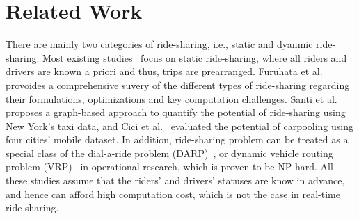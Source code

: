 \section{Related Work}
\label{sec:related}

There are mainly two categories of ride-sharing, i.e., static and dyanmic ride-sharing. Most existing studies~\cite{FuruhataTRB13, Santi14, CiciUbicom14} focus on static ride-sharing, where all riders and drivers are known a priori and thus, trips are prearranged. Furuhata et al.~\cite{FuruhataTRB13} provoides a comprehensive suvery of the different types of ride-sharing regarding their formulations, optimizations and key computation challenges. Santi et al.~\cite{Santi14} proposes a graph-based approach to quantify the potential of ride-sharing using New York's taxi data, and Cici et al.~\cite{CiciUbicom14} evaluated the potential of carpooling using four cities' mobile dataset. In addition, ride-sharing problem can be treated as a special class of the dial-a-ride problem (DARP)~\cite{Cordeau07}, or dynamic vehicle routing problem (VRP)~\cite{Dantzig59, LiSstd15} in operational research, which is proven to be NP-hard. All these studies assume that the riders' and drivers' statuses are know in advance, and hence can afford high computation cost, which is not the case in real-time ride-sharing.

